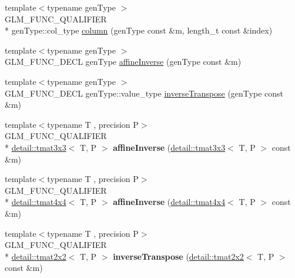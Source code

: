 \begin{DoxyCompactItemize}
{\footnotesize template$<$typename gen\-Type $>$ }\\G\-L\-M\-\_\-\-F\-U\-N\-C\-\_\-\-Q\-U\-A\-L\-I\-F\-I\-E\-R \\*
gen\-Type\-::col\-\_\-type \hyperlink{group__gtc__matrix__access_ga5c37fbeb062151f930e8a231c37e6b81}{column} (gen\-Type const \&m, length\-\_\-t const \&index)
\item 
{\footnotesize template$<$typename gen\-Type $>$ }\\G\-L\-M\-\_\-\-F\-U\-N\-C\-\_\-\-D\-E\-C\-L gen\-Type \hyperlink{group__gtc__matrix__inverse_gae0fcc5fc8783291f9702272de428fa0e}{affine\-Inverse} (gen\-Type const \&m)
\item 
{\footnotesize template$<$typename gen\-Type $>$ }\\G\-L\-M\-\_\-\-F\-U\-N\-C\-\_\-\-D\-E\-C\-L gen\-Type\-::value\-\_\-type \hyperlink{group__gtc__matrix__inverse_gac23f1be9db49b929cc74e40f17f48593}{inverse\-Transpose} (gen\-Type const \&m)
\item 
\hypertarget{namespaceglm_ae987f6c5b71756c91d1a4a6f65616ac9}{{\footnotesize template$<$typename T , precision P$>$ }\\G\-L\-M\-\_\-\-F\-U\-N\-C\-\_\-\-Q\-U\-A\-L\-I\-F\-I\-E\-R \\*
\hyperlink{structglm_1_1detail_1_1tmat3x3}{detail\-::tmat3x3}$<$ T, P $>$ {\bfseries affine\-Inverse} (\hyperlink{structglm_1_1detail_1_1tmat3x3}{detail\-::tmat3x3}$<$ T, P $>$ const \&m)}\label{namespaceglm_ae987f6c5b71756c91d1a4a6f65616ac9}

\item 
\hypertarget{namespaceglm_a9c15fbd234b0504882c00b6bccc0f818}{{\footnotesize template$<$typename T , precision P$>$ }\\G\-L\-M\-\_\-\-F\-U\-N\-C\-\_\-\-Q\-U\-A\-L\-I\-F\-I\-E\-R \\*
\hyperlink{structglm_1_1detail_1_1tmat4x4}{detail\-::tmat4x4}$<$ T, P $>$ {\bfseries affine\-Inverse} (\hyperlink{structglm_1_1detail_1_1tmat4x4}{detail\-::tmat4x4}$<$ T, P $>$ const \&m)}\label{namespaceglm_a9c15fbd234b0504882c00b6bccc0f818}

\item 
\hypertarget{namespaceglm_aadb5ab47ae129fe2b90f976465999629}{{\footnotesize template$<$typename T , precision P$>$ }\\G\-L\-M\-\_\-\-F\-U\-N\-C\-\_\-\-Q\-U\-A\-L\-I\-F\-I\-E\-R \\*
\hyperlink{structglm_1_1detail_1_1tmat2x2}{detail\-::tmat2x2}$<$ T, P $>$ {\bfseries inverse\-Transpose} (\hyperlink{structglm_1_1detail_1_1tmat2x2}{detail\-::tmat2x2}$<$ T, P $>$ const \&m)}\label{namespaceglm_aadb5ab47ae129fe2b90f976465999629}


\end{DoxyCompactItemize}
